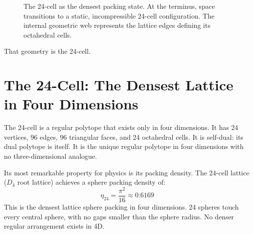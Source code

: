 \documentclass[11pt, letterpaper, openany]{book}
\begin{document}
\begin{figure}[H]
\centering
{}
\caption{The 24-cell as the densest packing state. At the terminus, space transitions to a static, incompressible 24-cell configuration. The internal geometric web represents the lattice edges defining its octahedral cells.}
\end{figure}

That geometry is the 24-cell.

\section{The 24-Cell: The Densest Lattice in Four Dimensions}

The 24-cell is a regular polytope that exists only in four dimensions.
It has 24 vertices, 96 edges, 96 triangular faces, and 24 octahedral cells.
It is self-dual: its dual polytope is itself. It is the unique regular
polytope in four dimensions with no three-dimensional analogue.

Its most remarkable property for physics is its packing density.
The 24-cell lattice ($D_4$ root lattice) achieves a sphere packing density of:
\[
\eta_{24} = \frac{\pi^2}{16} \approx 0.6169
\]
This is the densest lattice sphere packing in four dimensions. 24 spheres
touch every central sphere, with no gaps smaller than the sphere radius.
No denser regular arrangement exists in 4D.
\end{document}
